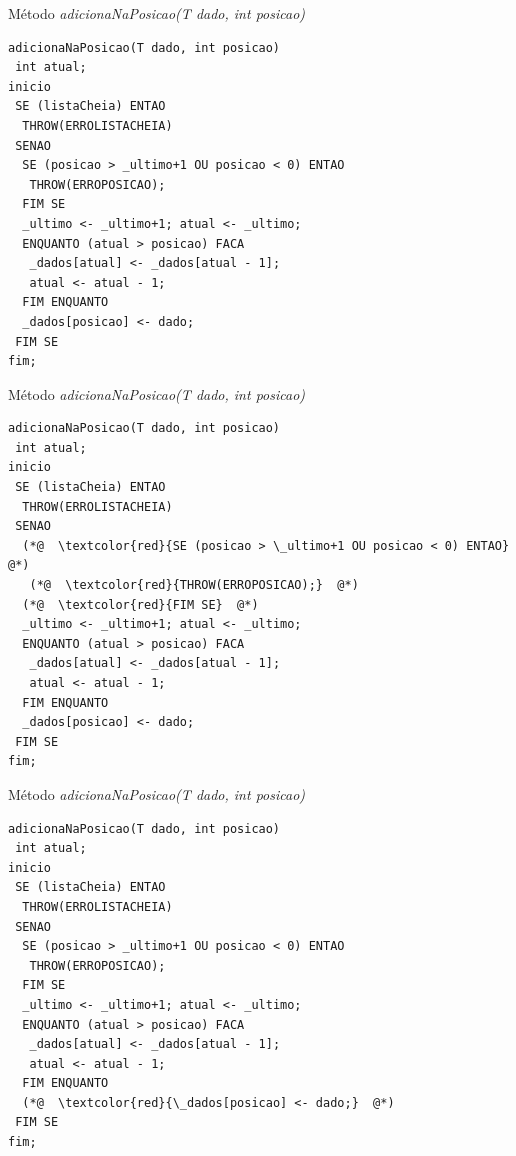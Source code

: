 \documentclass[12pt,table,xcolor={dvipsnames}]{beamer}
\begin{document}
\begin{frame}[fragile]{Método \textit{adicionaNaPosicao(T dado, int posicao)}}
\begin{lstlisting}
adicionaNaPosicao(T dado, int posicao)
 int atual;
inicio
 SE (listaCheia) ENTAO
  THROW(ERROLISTACHEIA)
 SENAO
  SE (posicao > _ultimo+1 OU posicao < 0) ENTAO
   THROW(ERROPOSICAO);
  FIM SE
  _ultimo <- _ultimo+1; atual <- _ultimo;
  ENQUANTO (atual > posicao) FACA
   _dados[atual] <- _dados[atual - 1];
   atual <- atual - 1;
  FIM ENQUANTO
  _dados[posicao] <- dado;
 FIM SE
fim;
\end{lstlisting}
\end{frame}

\begin{frame}[fragile]{Método \textit{adicionaNaPosicao(T dado, int posicao)}}
\begin{lstlisting}
adicionaNaPosicao(T dado, int posicao)
 int atual;
inicio
 SE (listaCheia) ENTAO
  THROW(ERROLISTACHEIA)
 SENAO
  (*@  \textcolor{red}{SE (posicao > \_ultimo+1 OU posicao < 0) ENTAO}  @*)
   (*@  \textcolor{red}{THROW(ERROPOSICAO);}  @*)
  (*@  \textcolor{red}{FIM SE}  @*)
  _ultimo <- _ultimo+1; atual <- _ultimo;
  ENQUANTO (atual > posicao) FACA
   _dados[atual] <- _dados[atual - 1];
   atual <- atual - 1;
  FIM ENQUANTO
  _dados[posicao] <- dado;
 FIM SE
fim;
\end{lstlisting}
\end{frame}

\begin{frame}[fragile]{Método \textit{adicionaNaPosicao(T dado, int posicao)}}
\begin{lstlisting}
adicionaNaPosicao(T dado, int posicao)
 int atual;
inicio
 SE (listaCheia) ENTAO
  THROW(ERROLISTACHEIA)
 SENAO
  SE (posicao > _ultimo+1 OU posicao < 0) ENTAO
   THROW(ERROPOSICAO);
  FIM SE
  _ultimo <- _ultimo+1; atual <- _ultimo;
  ENQUANTO (atual > posicao) FACA
   _dados[atual] <- _dados[atual - 1];
   atual <- atual - 1;
  FIM ENQUANTO
  (*@  \textcolor{red}{\_dados[posicao] <- dado;}  @*)
 FIM SE
fim;

\end{lstlisting}
\end{frame}
\end{document}
